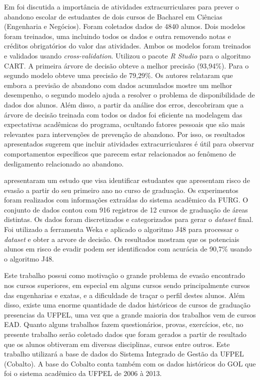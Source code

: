 \documentclass[diss-proposta,nocipinfo]{texufpel}
\begin{document}
Em \citet{hasbun2016extracurricular} foi discutida a importância de atividades extracurriculares para prever o abandono escolar de estudantes de dois cursos de Bacharel em Ciências (Engenharia e Negócios). Foram coletados dados de 4840 alunos. Dois modelos foram treinados, uma incluindo todos os dados e outra removendo notas e créditos obrigatórios do valor das atividades. Ambos os modelos foram treinados e validados usando \textit{cross-validation}. Utilizou o pacote \textit{R Studio} para o algoritmo CART. A primeira árvore de decisão obteve a melhor precisão (93,94\%). Para o segundo modelo obteve uma precisão de 79,29\%. Os autores relataram que embora a previsão de abandono com dados acumulados mostre um melhor desempenho, o segundo modelo ajuda a resolver o problema de disponibilidade de dados dos alunos. Além disso, a partir da análise dos erros, descobriram que a árvore de decisão treinada com todos os dados foi eficiente na modelagem das expectativas acadêmicas do programa, ocultando fatores pessoais que são mais relevantes para intervenções de prevenção de abandono. Por isso, os resultados apresentados sugerem que incluir atividades extracurriculares é útil para observar comportamentos específicos que parecem estar relacionados ao fenômeno de desligamento relacionado ao abandono.


\citet{lanes2018prediccao} apresentaram um estudo que visa identificar estudantes que apresentam risco de evasão a partir do seu primeiro ano no curso de graduação. Os experimentos foram realizados com informações extraídas do sistema acadêmico da FURG. O conjunto de dados contou com 916 registros de 12 cursos de graduação de áreas distintas. Os dados foram discretizados e categorizados para gerar o \textit{dataset} final. Foi utilizado a ferramenta Weka e aplicado o algoritmo J48 para processar o \textit{dataset} e obter a arvore de decisão. Os resultados mostram que os potenciais alunos em risco de evadir podem ser identificados com acurácia de 90,7\% usando o algoritmo J48.


Este trabalho possui como motivação o grande problema de evasão encontrado nos cursos superiores, em especial em alguns cursos sendo principalmente cursos das engenharias e exatas, e a dificuldade de traçar o perfil destes alunos. Além disso, existe uma enorme quantidade de dados históricos de cursos de graduação presencias da UFPEL, uma vez que a grande maioria dos trabalhos vem de cursos EAD. Quanto alguns trabalhos fazem questionários, provas, exercícios, etc, no presente trabalho serão coletado dados que foram gerados a partir de resultado que os alunos obtiveram em diversas disciplinas, cursos entre outros. Este trabalho utilizará a base de dados do Sistema Integrado de Gestão da UFPEL (Cobalto). A base do Cobalto conta também com os dados históricos do GOL que foi o sistema acadêmico da UFPEL de 2006 à 2013. %
\end{document}
